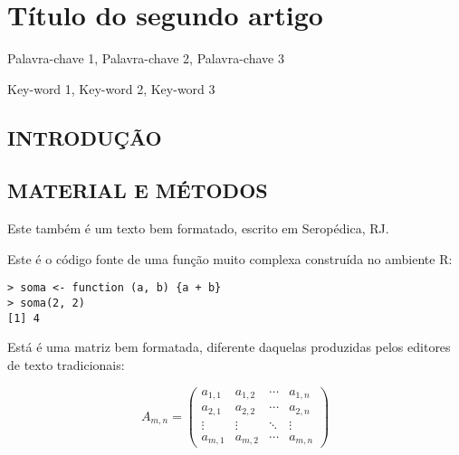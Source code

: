 \artigotrue
\chapter{Título do segundo artigo}
\label{chap:chapter01}

\begin{chapterabstractPOR}{Palavra-chave 1, Palavra-chave 2, Palavra-chave 3}
\end{chapterabstractPOR}

\begin{chapterabstractENG}{Key-word 1, Key-word 2, Key-word 3}
\end{chapterabstractENG}

\section{INTRODUÇÃO}

\blindtext[2]

\section{MATERIAL E MÉTODOS}

Este também é um texto bem formatado, escrito em Seropédica, RJ. \blindtext[1]

Este é o código fonte de uma função muito complexa construída no ambiente R:

\begin{verbatim}
> soma <- function (a, b) {a + b}
> soma(2, 2)
[1] 4
\end{verbatim}

Está é uma matriz bem formatada, diferente daquelas produzidas pelos editores de
texto tradicionais:

\begin{equation}
  A_{m,n} =
 \begin{pmatrix}
  a_{1,1} & a_{1,2} & \cdots & a_{1,n} \\
  a_{2,1} & a_{2,2} & \cdots & a_{2,n} \\
  \vdots  & \vdots  & \ddots & \vdots  \\
  a_{m,1} & a_{m,2} & \cdots & a_{m,n}
 \end{pmatrix}
\end{equation}


